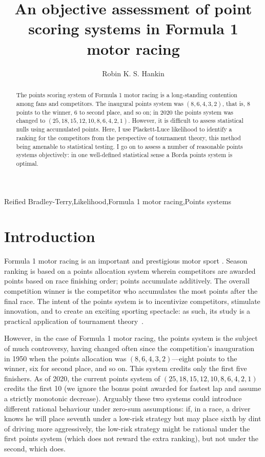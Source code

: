 \documentclass{elsarticle}
\begin{document}
\begin{frontmatter}
  \title{An objective assessment of point scoring systems in Formula 1 motor racing}
  \author{Robin K. S. Hankin}
\address{AUT University, 55 Wellesley Street, Auckland 1010, New Zealand}

\begin{abstract}
The points scoring system of Formula 1 motor racing is a long-standing
contention among fans and competitors.  The inaugural points system
was $(8,6,4,3,2)$, that is, 8 points to the winner, 6 to second place,
and so on; in 2020 the points system was changed to
$(25,18,15,12,10,8,6,4,2,1)$.  However, it is difficult to assess
statistical nulls using accumulated points.  Here, I use Plackett-Luce
likelihood to identify a ranking for the competitors from the
perspective of tournament theory, this method being amenable to
statistical testing.  I go on to assess a number of reasonable points
systems objectively: in one well-defined statistical sense a Borda
points system is optimal.
\end{abstract}
\begin{keyword}
Reified Bradley-Terry\sep Likelihood\sep Formula 1 motor racing\sep Points systems
\end{keyword}


\end{frontmatter}
\linenumbers

\newcommand{\raik}{R\"{a}ikk\"{o}nen}

\section{Introduction}\label{introduction}
Formula 1 motor racing is an important and prestigious motor sport
\citep{codling2017,jenkins2010}.  Season ranking is based on a points
allocation system wherein competitors are awarded points based on race
finishing order; points accumulate additively.  The overall
competition winner is the competitor who accumulates the most points
after the final race.  The intent of the points system is to
incentivize competitors, stimulate innovation, and to create an
exciting sporting spectacle: as such, its study is a practical
application of tournament theory~\citep{lazear1981}.

However, in the case of Formula 1 motor racing, the points system is
the subject of much controversy, having changed often since the
competition's inauguration in 1950 when the points allocation was
$(8,6,4,3,2)$---eight points to the winner, six for second place, and
so on.  This system credits only the first five finishers.  As of
2020, the current points system of $(25,18,15,12,10,8,6,4,2,1)$
credits the first 10 (we ignore the bonus point awarded for fastest
lap and assume a strictly monotonic decrease).  Arguably these two
systems could introduce different rational behaviour under zero-sum
assumptions: if, in a race, a driver knows he will place seventh under
a low-risk strategy but may place sixth by dint of driving more
aggressively, the low-risk strategy might be rational under the first
points system (which does not reward the extra ranking), but not under
the second, which does.
\end{document}
